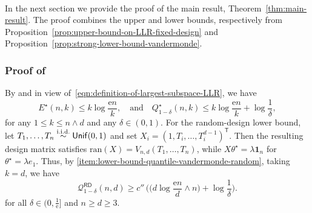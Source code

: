 \documentclass[11pt, letterpaper, hidelinks]{article}
\newcommand{\cQ}{\mathcal{Q}}
\newcommand{\twomin}[2]{\ensuremath{#1 \land #2}}
\newcommand{\e}{\mathrm{e}}
\newcommand{\1}{\mathbf 1}
\renewcommand{\leq}{\leqslant}
\renewcommand{\geq}{\geqslant}
\newcommand{\T}{\mathsf{T}}
\newcommand{\iid}{\textnormal{i.i.d.}}
\newcommand{\simiid}{\stackrel{\iid}{\sim}}
\theoremstyle{plain}
\theoremstyle{definition}
\newcommand{\thetastar}{\theta^\star}
\newcommand{\RD}{\mathsf{RD}}
\newcommand{\WorstCaseRandomDesignQuant}[3]{\cQ_{#1}^\RD(#2,#3)}
\newcommand{\ran}{\mathrm{ran}}
\begin{document}
\paragraph{}
In the next section we provide the proof of the main result, Theorem~\ref{thm:main-result}. The proof combines the upper and lower bounds, respectively from Proposition~\ref{prop:upper-bound-on-LLR-fixed-design} and Proposition~\ref{prop:strong-lower-bound-vandermonde}.



\subsubsection{Proof of~}
\label{sec:proof-thm-main-result}

By  and in view 
of~\cref{eqn:definition-of-largest-subspace-LLR}, we have 
\begin{equation}
\label{ineq:upper-bound-on-E-star-and-Q-star}
E^\star(n, k) \leq k \log \frac{\e n}{k}, 
\quad \mbox{and} \quad 
Q^\star_{1-\delta}(n,k) \leq 
k \log \frac{\e n}{k} + \log\frac{1}{\delta},
\end{equation}
for any $1 \leq k \leq \twomin{n}{d}$ and any $\delta \in (0, 1)$. 
For the random-design lower bound, let $T_1,\ldots,T_n\simiid\mathsf{Unif}(0,1)$ and set
$X_i=(1,T_i,\ldots,T_i^{d-1})^\T$. Then the resulting design matrix satisfies
$\ran(X)=V_{n,d}(T_1,\ldots,T_n)$, while $X\thetastar=\lambda\1_n$ for $\thetastar=\lambda e_1$.
Thus, by 
\ref{item:lower-bound-quantile-vandermonde-random}, 
taking $k=d$, we have 
\begin{equation}
\label{ineq:final-lower-bound-on-worst-case-random-design-quantile}
\WorstCaseRandomDesignQuant{1-\delta}{n}{d} \geq 
c'' \, \bigg(\Big(\twomin{d \log \frac{\e n}{d}}{n}\Big) + \log \frac{1}{\delta}\bigg).
\end{equation}
for all $\delta \in (0, \tfrac{1}{\e}]$ and $n\geq d\geq3$. 
\end{document}
